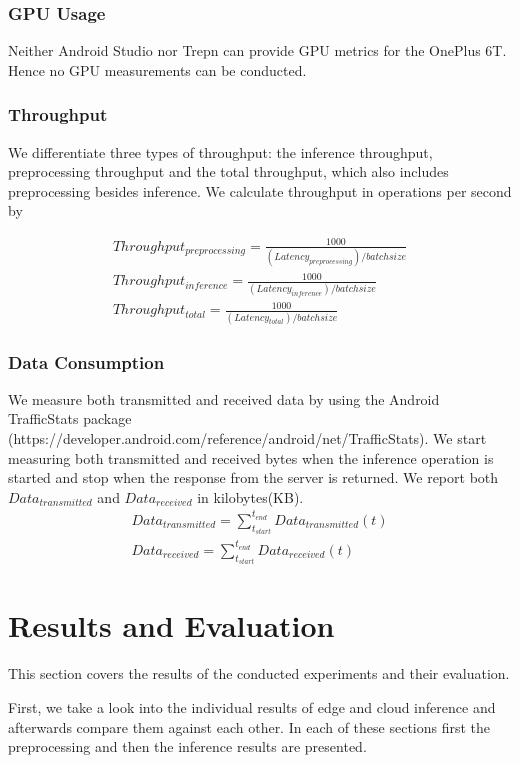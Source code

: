 \subsubsection{GPU Usage}
Neither Android Studio nor Trepn can provide GPU metrics for the OnePlus 6T. Hence no GPU measurements can be conducted.
\subsubsection{Throughput}
We differentiate three types of throughput: the inference throughput, preprocessing throughput and the total throughput, which also includes preprocessing besides inference.
We calculate throughput in operations per second by 

\begin{equation*}
\begin{gathered}
Throughput_{preprocessing} =\frac{1000}{(Latency_{preprocessing}) / batchsize}\\
Throughput_{inference} =\frac{1000}{(Latency_{inference}) / batchsize}\\
Throughput_{total}  =\frac{1000}{(Latency_{total}) / batchsize}
\end{gathered}
\end{equation*}
\subsubsection{Data Consumption}
We measure both transmitted and received data by using the Android TrafficStats package (https://developer.android.com/reference/android/net/TrafficStats). We start measuring both transmitted and received bytes when the inference operation is started and stop when the response from the server is returned. We report both $Data_{transmitted}$ and $Data_{received}$ in kilobytes(KB).
\begin{equation*}
\begin{gathered}
Data_{transmitted} = \sum_{t_{start}}^{t_{end}} Data_{transmitted}(t)\\
Data_{received} = \sum_{t_{start}}^{t_{end}} Data_{received}(t)
\end{gathered}
\end{equation*}
\section{Results and Evaluation}
This section covers the results of the conducted experiments and their evaluation.

First, we take a look into the individual results of edge and cloud inference and afterwards compare them against each other. In each of these sections first the preprocessing and then the inference results are presented.

